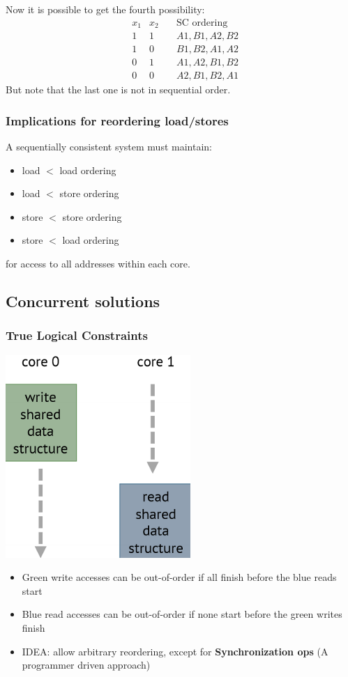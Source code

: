 \documentclass[letterpaper,12pt]{article}
\begin{document}
Now it is possible to get the fourth possibility:\begin{align*}
     & x_1 & x_2 \quad & \text{SC ordering} \\
     & 1   & 1 \quad  & A1,B1,A2,B2        \\
     & 1   & 0 \quad  & B1,B2,A1,A2        \\
     & 0   & 1 \quad  & A1,A2,B1,B2        \\
     & 0   & 0 \quad  & A2,B1,B2,A1
\end{align*}
But note that the last one is not in sequential order.
\subsubsection{Implications for reordering load/stores}
A sequentially consistent system must maintain:\begin{itemize}
    \item load $<$ load ordering
    \item load $<$ store ordering
    \item store $<$ store ordering
    \item store $<$ load ordering
\end{itemize}
for access to all addresses within each core.

\subsection{Concurrent solutions}
\subsubsection{True Logical Constraints}
\includegraphics*{./Image/True Logical Constraints.png}

\begin{itemize}
    \item Green write accesses can be out-of-order if all finish before the blue reads start
    \item Blue read accesses can be out-of-order if none start before the green writes finish
    \item IDEA: allow arbitrary reordering, except for \textbf{Synchronization ops} (A programmer driven approach)
\end{itemize}
\end{document}

